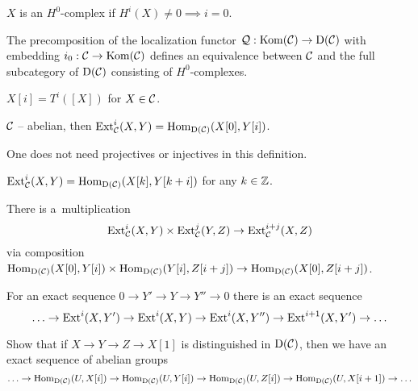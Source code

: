 



	\begin{definition}
		$X$ is an $H^0$-complex if $H^i(X) \neq 0 \implies i = 0$.
	\end{definition}
	
	\begin{theorem}
		The precomposition of the localization functor $\mathcal{Q} : \mathrm{Kom}(\mathcal{C}) \to {\mathrm{D}({\mathcal{C}})}$
		with embedding $i_0: \mathcal{C} \to \mathrm{Kom}(\mathcal{C})$ defines an equivalence between $\mathcal{C}$
		and the full subcategory of ${\mathrm{D}({\mathcal{C}})}$ consisting of $H^0$-complexes.
	\end{theorem}
	
	\begin{definition}
		$X[i] = T^i([X])$ for $X \in \mathcal{C}$.
	\end{definition}

	
	\begin{definition}
		$\mathcal{C}$ -- abelian, then $\mathrm{Ext}_{\mathcal{C}}^i(X,Y) = \mathrm{Hom}_{{\mathrm{D}({\mathcal{C}})}}(X[0], Y[i])$.
	\end{definition}
	
	\begin{remark}
		One does not need projectives or injectives in this definition.
	\end{remark}
	
	\begin{remark}
		$\mathrm{Ext}_{\mathcal{C}}^i(X,Y) = \mathrm{Hom}_{{\mathrm{D}({\mathcal{C}})}}(X[k], Y[k+i])$ for any $k \in {\mathbb{Z}}$.
	\end{remark}
	
	\begin{definition}[multiplication]
		There is a~multiplication 
		$$\mathrm{Ext}_{\mathcal{C}}^i(X,Y) \times \mathrm{Ext}_{\mathcal{C}}^j(Y,Z) \to \mathrm{Ext}_{\mathcal{C}}^{i+j}(X,Z)$$
		via composition
		$\mathrm{Hom}_{{\mathrm{D}({\mathcal{C}})}}(X[0],Y[i]) \times \mathrm{Hom}_{{\mathrm{D}({\mathcal{C}})}}(Y[i],Z[i+j])
		\to \mathrm{Hom}_{{\mathrm{D}({\mathcal{C}})}}(X[0],Z[i+j])$.
	\end{definition}
	
	\begin{fact}
		For an exact sequence $0 \to Y' \to Y \to Y'' \to 0$ there is 
		an exact sequence
		$$\ldots\to \mathrm{Ext}^i(X,Y') \to \mathrm{Ext}^i(X,Y) \to \mathrm{Ext}^i(X,Y'') 
		\to \mathrm{Ext}^{i+1}(X,Y') \to \ldots$$
	\end{fact}
	
	\begin{exercise}
		Show that if $X \to Y \to Z \to X[1]$ is distinguished in ${\mathrm{D}({\mathcal{C}})}$,
		then we have an exact sequence of abelian groups
		$$\ldots \to \mathrm{Hom}_{{\mathrm{D}({\mathcal{C}})}}(U, X[i])
		\to \mathrm{Hom}_{{\mathrm{D}({\mathcal{C}})}}(U, Y[i])
		\to \mathrm{Hom}_{{\mathrm{D}({\mathcal{C}})}}(U, Z[i])
		\to \mathrm{Hom}_{{\mathrm{D}({\mathcal{C}})}}(U, X[i+1]) \to \ldots$$
	\end{exercise}
	
